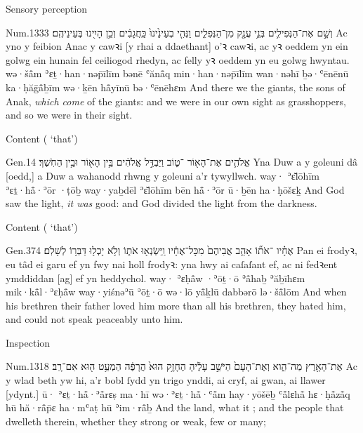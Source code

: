 \begin{frame}{\ex Sensory perception}
	\begin{example}{Num.}{13}{33}{}{}
		\quoling
		{וְשָׁ֣ם  אֶת־הַנְּפִילִ֛ים בְּנֵ֥י עֲנָ֖ק מִן־הַנְּפִלִ֑ים וַנְּהִ֤י בְעֵינֵ֙ינוּ֙ כַּֽחֲגָבִ֔ים וְכֵ֥ן הָיִ֖ינוּ בְּעֵינֵיהֶֽם׃}
		{Ac yno y  feibion Anac y cawꝛi [y rhai a ddaethant] o’ꝛ cawꝛi, ac yꝛ oeddem yn ein golwg ein hunain fel ceiliogod rhedyn, ac felly yꝛ oeddem yn eu golwg hwyntau.}
		{wə·šå̄m  ʾɛṯ·han·nəp̄īlīm bənē ʿănå̄q min·han·nəp̄īlīm wan·nəhī ḇə·ʿēnēnū ka·ḥăḡå̄ḇīm wə·ḵēn hå̄yīnū bə·ʿēnēhɛm}
		{And there we  the giants, the sons of Anak, \emph{which come} of the giants: and we were in our own sight as grasshoppers, and so we were in their sight.}
	\end{example}
\end{frame}


\begin{frame}{\ex Content ( ‘that’)}
	\begin{example}{Gen.}{1}{4}{}{}
		\quoling
		{ אֱלֹהִ֛ים אֶת־הָא֖וֹר ־ט֑וֹב וַיַּבְדֵּ֣ל אֱלֹהִ֔ים בֵּ֥ין הָא֖וֹר וּבֵ֥ין הַחֹֽשֶׁךְ׃}
		{Yna Duw a  y goleuni  dâ [oedd,] a Duw a wahanodd rhwng y goleuni a’r tywyllwch.}
		{way· ʾɛ̆lōhīm ʾɛṯ·hå̄·ʾōr ·ṭōḇ way·yaḇdēl ʾɛ̆lōhīm bēn hå̄·ʾōr ū·ḇēn ha·ḥōšɛḵ}
		{And God saw the light,  \emph{it was} good: and God divided the light from the darkness.}
	\end{example}
\end{frame}


\begin{frame}{\ex Content ( ‘that’)}
	\begin{example}{Gen.}{37}{4}{}{}
		\quoling
		{ אֶחָ֗יו ־אֹת֞וֹ אָהַ֤ב אֲבִיהֶם֙ מִכָּל־אֶחָ֔יו וַֽיִּשְׂנְא֖וּ אֹת֑וֹ וְלֹ֥א יָכְל֖וּ דַּבְּר֥וֹ לְשָׁלֹֽם׃}
		{Pan  ei frodyꝛ,  eu tâd  ei garu ef yn fwy nai holl frodyꝛ: yna hwy ai caſaſant ef, ac ni fedꝛent ymddiddan [ag] ef yn heddychol.}
		{way· ʾɛḥå̄w ·ʾōṯ·ō ʾå̄haḇ ʾăḇīhɛm mik·kå̄l·ʾɛḥå̄w way·yiśnəʾū ʾōṯ·ō wə·lō yå̄ḵlū dabbərō lə·šå̄lōm}
		{And when his brethren   their father loved him more than all his brethren, they hated him, and could not speak peaceably unto him.}
	\end{example}
\end{frame}


\begin{frame}{\ex Inspection}
	\begin{example}{Num.}{13}{18}{}{}
		\quoling
		{ אֶת־הָאָ֖רֶץ מַה־הִ֑וא וְאֶת־הָעָם֙ הַיֹּשֵׁ֣ב עָלֶ֔יהָ הֶחָזָ֥ק הוּא֙ הֲרָפֶ֔ה הַמְעַ֥ט ה֖וּא אִם־רָֽב׃}
		{Ac  y wlad beth yw hi, a’r bobl ſydd yn trigo ynddi, ai cryf, ai gwan, ai llawer [ydynt.]}
		{ū· ʾɛṯ·hå̄·ʾå̄rɛṣ ma·hī wə·ʾɛṯ·hå̄·ʿå̄m hay·yōšēḇ ʿå̄lɛhå̄ hɛ·ḥå̄zå̄q hū hă·rå̄p̄ɛ ha·mʿaṭ hū ʾim·rå̄ḇ}
		{And  the land, what it ; and the people that dwelleth therein, whether they  strong or weak, few or many;}
	\end{example}
\end{frame}


